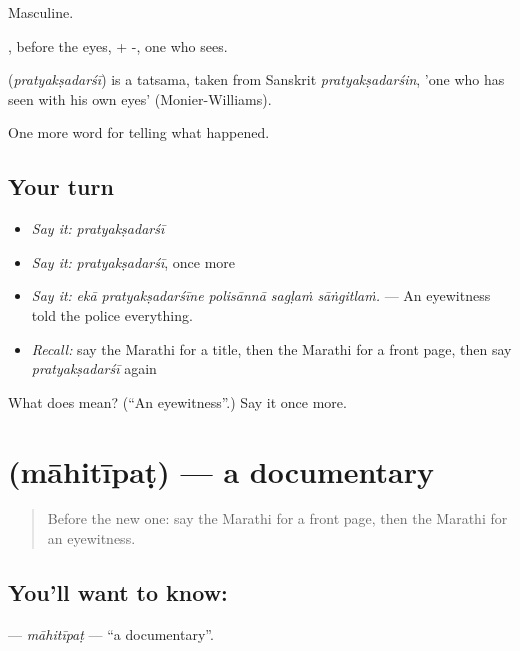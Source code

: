 Masculine.

, before the eyes, + -, one who sees.

\begin{cousinweb}
\textbf{} (\emph{pratyakṣadarśī}) is a tatsama, taken from Sanskrit \emph{pratyakṣadarśin}, 'one who has seen with his own eyes' (Monier-Williams).
\end{cousinweb}

\begin{grammarlens}[title={What you've built}]
One more word for telling what happened.
\end{grammarlens}

\subsection*{Your turn}
\begin{itemize}
\raggedright
  \item \emph{Say it:} \emph{pratyakṣadarśī}
  \item \emph{Say it:} \emph{pratyakṣadarśī}, once more
  \item \emph{Say it:} \emph{ekā pratyakṣadarśīne polisānnā sagḷaṁ sāṅgitlaṁ.} — An eyewitness told the police everything.
  \item \emph{Recall:} say the Marathi for a title, then the Marathi for a front page, then say \emph{pratyakṣadarśī} again
\end{itemize}

\begin{tcolorbox}[breakable,colback=teal!4,colframe=teal!35!black,title={Before you move on}]
What does  mean? (\textquotedblleft{}An eyewitness\textquotedblright{}.) Say it once more.
\end{tcolorbox}
\section[\texorpdfstring{\mr{माहितीपट} (māhitīpaṭ)}{माहितीपट (māhitīpaṭ)}]{ (māhitīpaṭ) — a documentary}

\label{lesson:MR-C315-mahitipat}



\begin{quote}
Before the new one: say the Marathi for a front page, then the Marathi for an eyewitness.
\end{quote}

\subsection*{You'll want to know: }
\textbf{} — \emph{māhitīpaṭ} — \textquotedblleft{}a documentary\textquotedblright{}.

